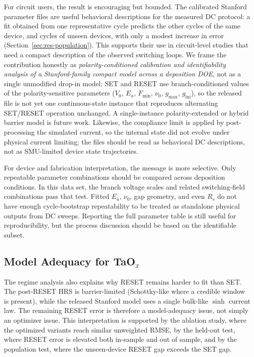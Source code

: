 \documentclass[journal]{IEEEtran}
\begin{document}
For circuit users, the result is encouraging but bounded.  The calibrated
Stanford parameter files are useful behavioral descriptions for the measured
DC protocol: a fit obtained from one representative cycle predicts the other
cycles of the same device, and cycles of unseen devices, with only a modest
increase in error (Section~\ref{sec:res-population}).  This supports their use
in circuit-level studies that need a compact description of the observed
switching loops.  We frame the contribution honestly as
\emph{polarity-conditioned calibration and identifiability analysis of a
Stanford-family compact model across a deposition DOE}, not as a single
unmodified drop-in model: SET and RESET use branch-conditioned values of the
polarity-sensitive parameters ($V_0$, $E_a$, $F_{\min}$, $\nu_0$, $g_{\max}$,
$g_{\mathrm{ini}}$), so the released file is not yet one continuous-state
instance that reproduces alternating SET/RESET operation unchanged.  A
single-instance polarity-extended or hybrid barrier model is future work.
Likewise, the compliance limit is applied by post-processing the simulated
current, so the internal state did not evolve under physical current limiting;
the files should be read as behavioral DC descriptions, not as SMU-limited
device state trajectories.

For device and fabrication interpretation, the message is more selective.
Only repeatable parameter combinations should be compared across deposition
conditions.  In this data set, the branch voltage scales and related
switching-field combinations pass that test.  Fitted $E_a$, $\nu_0$, gap
geometry, and even $R_s$ do not have enough cycle-bootstrap repeatability to
be treated as standalone physical outputs from DC sweeps.  Reporting the full
parameter table is still useful for reproducibility, but the process
discussion should be based on the identifiable subset.

\subsection{Model Adequacy for TaO$_x$}

The regime analysis also explains why RESET remains harder to fit than SET.
The post-RESET HRS is barrier-limited (Schottky-like where a credible window is
present), while the released Stanford model uses a single bulk-like $\sinh$
current law.  The remaining RESET error is therefore a model-adequacy issue,
not simply an optimizer issue.  This interpretation is supported by the
ablation study, where the optimized variants reach similar unweighted RMSE, by
the held-out test, where RESET error is elevated both in-sample and out of
sample, and by the population test, where the unseen-device RESET gap exceeds
the SET gap.
\end{document}
